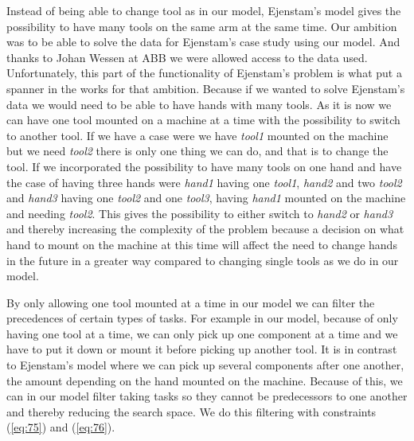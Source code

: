 Instead of being able to change tool as in our model, Ejenstam's model gives the possibility to have many tools on the same arm at the same time. Our ambition was to be able to solve the data for Ejenstam's case study using our model. And thanks to Johan Wessen at ABB we were allowed access to the data used. Unfortunately, this part of the functionality of Ejenstam's problem is what put a spanner in the works for that ambition. Because if we wanted to solve Ejenstam's data we would need to be able to have hands with many tools. As it is now we can have one tool mounted on a machine at a time with the possibility to switch to another tool. If we have a case were we have \emph{tool1} mounted on the machine but we need \emph{tool2} there is only one thing we can do, and that is to change the tool. If we incorporated the possibility to have many tools on one hand and have the case of having three hands were \emph{hand1} having one \emph{tool1}, \emph{hand2} and two \emph{tool2} and \emph{hand3} having one \emph{tool2} and one \emph{tool3}, having \emph{hand1} mounted on the machine and needing \emph{tool2}. This gives the possibility to either switch to \emph{hand2} or \emph{hand3} and thereby increasing the complexity of the problem because a decision on what hand to mount on the machine at this time will affect the need to change hands in the future in a greater way compared to changing single tools as we do in our model.

By only allowing one tool mounted at a time in our model we can filter the precedences of certain types of tasks. For example in our model, because of only having one tool at a time, we can only pick up one component at a time and we have to put it down or mount it before picking up another tool. It is in contrast to Ejenstam's model where we can pick up several components after one another, the amount depending on the hand mounted on the machine. Because of this, we can in our model filter taking tasks so they cannot be predecessors to one another and thereby reducing the search space. We do this filtering with constraints (\ref{eq:75}) and (\ref{eq:76}).

